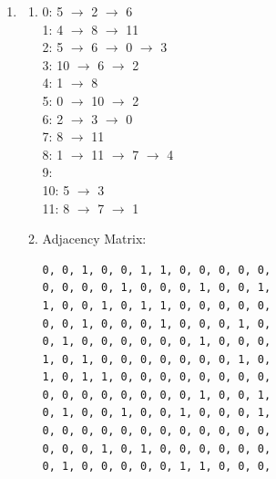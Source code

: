 \documentclass[11pt,fleqn]{article}
\begin{document}
\begin{enumerate}
	\item 	
		\begin{enumerate}
			\item 
0: 5 $\rightarrow$ 2 $\rightarrow$ 6 \\
1: 4 $\rightarrow$ 8 $\rightarrow$ 11 \\
2: 5 $\rightarrow$ 6 $\rightarrow$ 0 $\rightarrow$ 3 \\
3: 10 $\rightarrow$ 6 $\rightarrow$ 2 \\
4: 1 $\rightarrow$ 8 \\
5: 0 $\rightarrow$ 10 $\rightarrow$ 2 \\
6: 2 $\rightarrow$ 3 $\rightarrow$ 0 \\
7: 8 $\rightarrow$ 11 \\
8: 1 $\rightarrow$ 11 $\rightarrow$ 7 $\rightarrow$ 4 \\
9: \\
10: 5 $\rightarrow$ 3 \\
11: 8 $\rightarrow$ 7 $\rightarrow$ 1
			\item Adjacency Matrix:

\begin{verbatim}
0, 0, 1, 0, 0, 1, 1, 0, 0, 0, 0, 0, 
0, 0, 0, 0, 1, 0, 0, 0, 1, 0, 0, 1, 
1, 0, 0, 1, 0, 1, 1, 0, 0, 0, 0, 0, 
0, 0, 1, 0, 0, 0, 1, 0, 0, 0, 1, 0, 
0, 1, 0, 0, 0, 0, 0, 0, 1, 0, 0, 0, 
1, 0, 1, 0, 0, 0, 0, 0, 0, 0, 1, 0, 
1, 0, 1, 1, 0, 0, 0, 0, 0, 0, 0, 0, 
0, 0, 0, 0, 0, 0, 0, 0, 1, 0, 0, 1, 
0, 1, 0, 0, 1, 0, 0, 1, 0, 0, 0, 1, 
0, 0, 0, 0, 0, 0, 0, 0, 0, 0, 0, 0, 
0, 0, 0, 1, 0, 1, 0, 0, 0, 0, 0, 0, 
0, 1, 0, 0, 0, 0, 0, 1, 1, 0, 0, 0, 
\end{verbatim}
		\end{enumerate}

\newpage


\end{enumerate}
\end{document}
